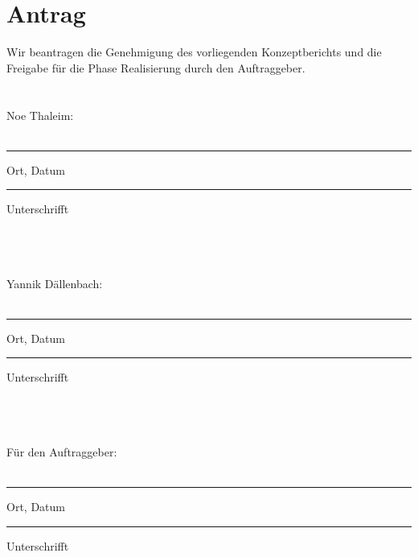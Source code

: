 \pagebreak
\section{Antrag}
	Wir beantragen die Genehmigung des vorliegenden Konzeptberichts und die Freigabe für die Phase Realisierung durch den Auftraggeber.
	\\ \\ \\
	Noe Thaleim:
	\\ \\
	\parbox{4cm}{\hrule
	\strut \centering\footnotesize Ort, Datum} \hfill\parbox{4cm}{\hrule
	\strut \centering\footnotesize Unterschrifft}
	\\ \\ \\
	Yannik Dällenbach:
	\\ \\
	\parbox{4cm}{\hrule
	\strut \centering\footnotesize Ort, Datum} \hfill\parbox{4cm}{\hrule
	\strut \centering\footnotesize Unterschrifft}
	\\ \\ \\
	Für den Auftraggeber:
	\\ \\
	\parbox{4cm}{\hrule
	\strut \centering\footnotesize Ort, Datum} \hfill\parbox{4cm}{\hrule
	\strut \centering\footnotesize Unterschrifft}
